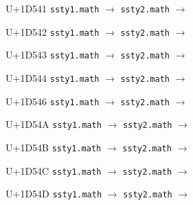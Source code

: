 \documentclass{article}
\begin{document}
\begin{substitutions}
\goodbreak

U+1D541  \linebreak
    \texttt{ssty1.math} $\to$  \linebreak
    \texttt{ssty2.math} $\to$  

\goodbreak

U+1D542  \linebreak
    \texttt{ssty1.math} $\to$  \linebreak
    \texttt{ssty2.math} $\to$  

\goodbreak

U+1D543  \linebreak
    \texttt{ssty1.math} $\to$  \linebreak
    \texttt{ssty2.math} $\to$  

\goodbreak

U+1D544  \linebreak
    \texttt{ssty1.math} $\to$  \linebreak
    \texttt{ssty2.math} $\to$  

\goodbreak

U+1D546  \linebreak
    \texttt{ssty1.math} $\to$  \linebreak
    \texttt{ssty2.math} $\to$  

\goodbreak

U+1D54A  \linebreak
    \texttt{ssty1.math} $\to$  \linebreak
    \texttt{ssty2.math} $\to$  

\goodbreak

U+1D54B  \linebreak
    \texttt{ssty1.math} $\to$  \linebreak
    \texttt{ssty2.math} $\to$  

\goodbreak

U+1D54C  \linebreak
    \texttt{ssty1.math} $\to$  \linebreak
    \texttt{ssty2.math} $\to$  

\goodbreak

U+1D54D  \linebreak
    \texttt{ssty1.math} $\to$  \linebreak
    \texttt{ssty2.math} $\to$  


\end{substitutions}
\end{document}
